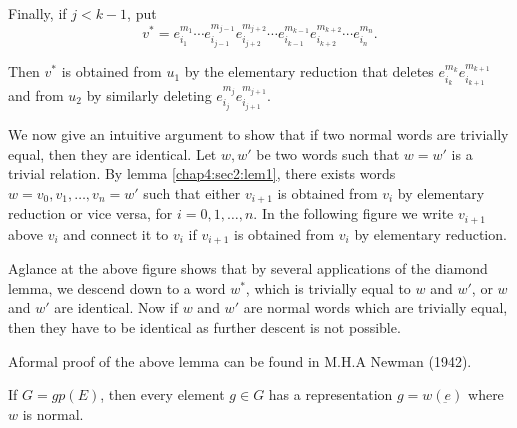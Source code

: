 Finally, if $j <k-1$, put
$$
v^*=e^{m_1}_{i_1}\cdots e^{m_{j-1}}_{i_{j-1}}e^{m_{j+2}}_{i_{j+2}}
\cdots e^{m_{k-1}}_{i_{k-1}} e^{m_{k+2}}_{i_{k+2}} \cdots
e^{m_n}_{i_n}. 
$$

Then $v^*$ is obtained from $u_1$ by the elementary reduction that
deletes $e^{m_k}_{i_k}e^{m_{k+1}}_{i_{k+1}}$ and from $u_2$ by
similarly deleting $e^{m_j}_{i_j} e^{m_{j+1}}_{i_{j+1}}$. 

We now give an intuitive argument to show that if two normal words are
trivially equal, then they are identical. Let $w,w'$ be two words such
that $w = w'$ is a trivial relation. By lemma \ref{chap4:sec2:lem1},
there exists words 
$w=v_0,v_1, \ldots, v_n=w'$ such that either $v_{i+1}$ is obtained
from $v_i$ by elementary reduction or vice versa, for $i=0,1, \ldots
,n$. In the following figure we write $v_{i+1}$ above $v_i$ and
connect it to $v_i$ if $v_{i+1}$ is obtained from $v_i$ by elementary
reduction. 

\begin{figure}[H]
\end{figure}

A\pageoriginale glance at the above figure shows that by several applications of the
diamond lemma, we descend down to a word $w^*$, which is trivially
equal to $w$ and $w'$, or $w$ and $w'$ are identical. Now if $w$ and
$w'$ are normal words which are trivially equal, then they have to be
identical as further descent is not possible. 

A\pageoriginale formal proof of the above lemma can be found in M.H.A
Newman (1942). 
\begin{coro*}
  If $G=gp(E)$, then every element $g \in G$ has a representation
  $g=w(\underbar{e})$ where $w$ is normal. 
\end{coro*}


